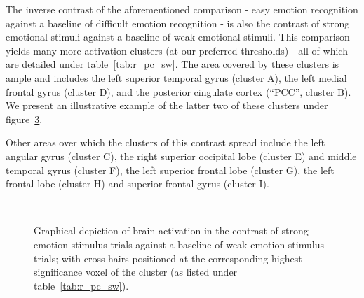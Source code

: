 	    The inverse contrast of the aforementioned comparison - easy emotion recognition against a baseline of difficult emotion recognition - is also the contrast of strong emotional stimuli against a baseline of weak emotional stimuli.
	    This comparison yields many more activation clusters (at our preferred thresholds) - all of which are detailed under table~\ref{tab:r_pc_sw}.
	    The area covered by these clusters is ample and includes the left superior temporal gyrus (cluster A), the left medial frontal gyrus (cluster D), and the posterior cingulate cortex (“PCC”, cluster B).
	    We present an illustrative example of the latter two of these clusters under figure~\ref{fig:r_pc_sw}.
	    
	    Other areas over which the clusters of this contrast spread include the left angular gyrus (cluster C), the right superior occipital lobe (cluster E) and middle temporal gyrus (cluster F), the left superior frontal lobe (cluster G), the left frontal lobe (cluster H) and superior frontal gyrus (cluster I).
	    \begin{figure}[H]
		\begin{subfigure}[H]{0.495\textwidth}
		    \centering{}
		    \label{fig:r_pc_sw_mf}
		\end{subfigure}
		~%
		\begin{subfigure}[H]{0.495\textwidth}
		    \centering{}
		    \label{fig:r_pc_sw_pcc}
		\end{subfigure}
		\caption{Graphical depiction of brain activation in the contrast of strong emotion stimulus trials against a baseline of weak emotion stimulus trials; with cross-hairs positioned at the corresponding highest significance voxel of the cluster (as listed under table~\ref{tab:r_pc_sw}).}
		\label{fig:r_pc_sw}
	    \end{figure}
	
